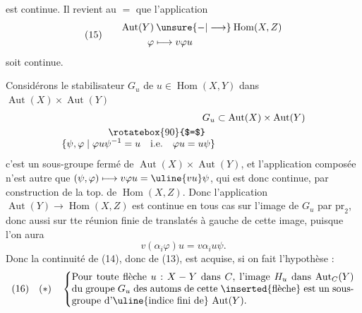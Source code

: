 est continue. Il revient au $=$ que l'application
\[
(15)\qquad\begin{aligned}
\operatorname{Aut}(Y)&\mathbin{\unsure{-|\longrightarrow}}\operatorname{Hom}(X,Z)\\
\varphi&\longmapsto v\varphi u
\end{aligned}
\]
soit continue.

Considérons  le stabilisateur 
$G_u$ de $u\in\operatorname{Hom}(X,Y)$ dans $\operatorname{Aut}(X)\times\operatorname{Aut}(Y)$
\[
\begin{aligned}
G_u&\subset\operatorname{Aut}(X)\times\operatorname{Aut}(Y)\\
\rotatebox{90}{$=$}\quad&\\[-1ex]
\{\psi,\varphi\mid\varphi u\psi^{-1}=u\quad\text{i.e.}\quad\varphi u=u\psi\}&
\end{aligned}
\]
c'est un sous-groupe fermé de $\operatorname{Aut}(X)\times\operatorname{Aut}(Y)$,
et l'application composée
n'est autre que $(\psi,\varphi)\longmapsto v\varphi u=\uline{vu}\psi$, qui est
donc continue, par construction de la top. de
$\operatorname{Hom}(X,Z)$. Donc l'application $\operatorname{Aut}(Y)\longrightarrow\operatorname{Hom}(X,Z)$
est continue en tous cas sur l'image  de $G_u$
par $\mathrm{pr}_2$,  donc aussi sur tte réunion
finie de translatés à gauche  de cette image,
puisque l'on aura 
\[
v(\alpha_i\varphi)u=v\alpha_i u\psi.
\]
Donc la continuité de (14), donc de (13), est
acquise, si on fait l'hypothèse :
\[
(16)\quad(*)\quad\left\{
\begin{minipage}{0.83\linewidth}
Pour toute flèche $u:X\mathbin{-}Y$ dans $C$, l'image
$H_u$ dans $\operatorname{Aut}_C(Y)$ du groupe $G_u$ des automs de cette
\inserted{flèche} est un sous-groupe d'\uline{indice fini de}
$\operatorname{Aut}(Y)$.
\end{minipage}\right.
\]
